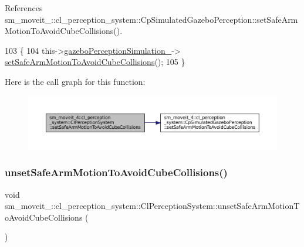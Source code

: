 References sm\+\_\+moveit\+\_\+::cl\+\_\+perception\+\_\+system\+::\+Cp\+Simulated\+Gazebo\+Perception\+::set\+Safe\+Arm\+Motion\+To\+Avoid\+Cube\+Collisions().


\begin{DoxyCode}
103             \{
104                 this->\hyperlink{classsm__moveit__4_1_1cl__perception__system_1_1ClPerceptionSystem_a027c07df3f1a2cc0c30be111b27dbe5c}{gazeboPerceptionSimulation\_}->
      \hyperlink{classsm__moveit__4_1_1cl__perception__system_1_1CpSimulatedGazeboPerception_af42b5a4e239fcac98a222c34115c9bc0}{setSafeArmMotionToAvoidCubeCollisions}();
105             \}
\end{DoxyCode}
Here is the call graph for this function\+:
\nopagebreak
\begin{figure}[H]
\begin{center}
\leavevmode
\includegraphics[width=350pt]{classsm__moveit__4_1_1cl__perception__system_1_1ClPerceptionSystem_a5304dc8734488564093525dfe4f4bcd1_cgraph}
\end{center}
\end{figure}
\mbox{\label{classsm__moveit__4_1_1cl__perception__system_1_1ClPerceptionSystem_ab8bbe4be37d763fde0e67e9edd33b83a}} 
\subsubsection{\texorpdfstring{unset\+Safe\+Arm\+Motion\+To\+Avoid\+Cube\+Collisions()}{unsetSafeArmMotionToAvoidCubeCollisions()}}
{\footnotesize\ttfamily void sm\+\_\+moveit\+\_\+::cl\+\_\+perception\+\_\+system\+::\+Cl\+Perception\+System\+::unset\+Safe\+Arm\+Motion\+To\+Avoid\+Cube\+Collisions (\begin{DoxyParamCaption}{ }\end{DoxyParamCaption})\hspace{0.3cm}{\ttfamily [inline]}}




